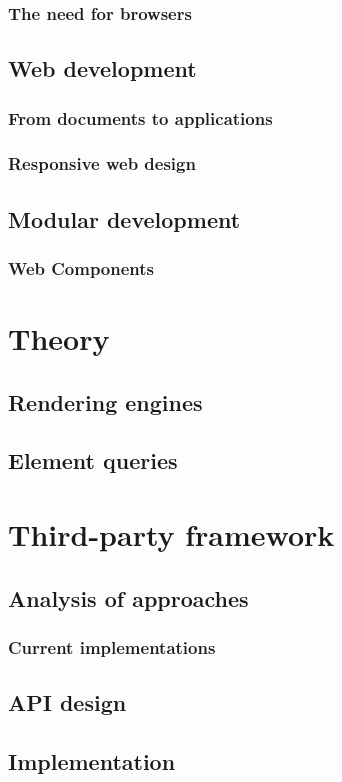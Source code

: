 \documentclass[a4paper,11pt]{kth-mag}
\begin{document}
      \section{The need for browsers}
      \label{sec:browsers}

    \chapter{Web development}
      \section{From documents to applications}
      \section{Responsive web design}
    \chapter{Modular development}
      \section{Web Components}
  \part{Theory}
    \chapter{Rendering engines}
    \chapter{Element queries}
  \part{Third-party framework}
    \chapter{Analysis of approaches}
    \section{Current implementations}
    \chapter{API design}
    \chapter{Implementation}
\end{document}
